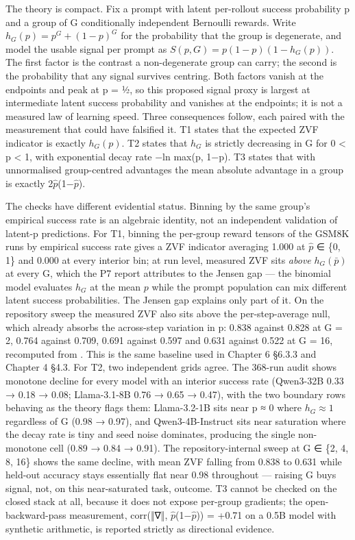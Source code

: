 \documentclass[12pt,a4paper]{report}
\DeclareRobustCommand{\longtok}[1]{\texttt{\seqsplit{#1}}}
\begin{document}
The theory is compact. Fix a prompt with latent per-rollout success
probability p and a group of G conditionally independent Bernoulli
rewards. Write \(h_G(p) = p^G + (1-p)^G\) for the probability that the
group is degenerate, and model the usable signal per prompt as
\(S(p,G) = p(1-p)(1-h_G(p))\). The first factor is the contrast a
non-degenerate group can carry; the second is the probability that any
signal survives centring. Both factors vanish at the endpoints and peak
at p = ½, so this proposed signal proxy is largest at intermediate
latent success probability and vanishes at the endpoints; it is not a
measured law of learning speed. Three consequences follow, each paired
with the measurement that could have falsified it. T1 states that the
expected ZVF indicator is exactly \(h_G(p)\). T2 states that \(h_G\) is
strictly decreasing in G for 0 \textless{} p \textless{} 1, with
exponential decay rate −ln max(p, 1−p). T3 states that with unnormalised
group-centred advantages the mean absolute advantage in a group is
exactly 2\ensuremath{\hat{p}}(1−\ensuremath{\hat{p}}).

The checks have different evidential status. Binning by the same group's
empirical success rate is an algebraic identity, not an independent
validation of latent-p predictions. For T1, binning the per-group reward
tensors of the GSM8K runs by empirical success rate gives a ZVF
indicator averaging 1.000 at \ensuremath{\hat{p}} ∈ \{0, 1\} and 0.000 at every interior
bin; at run level, measured ZVF sits \emph{above} \(h_G(\bar p)\) at
every G, which the P7 report attributes to the Jensen gap --- the
binomial model evaluates \(h_G\) at the mean \(p\) while the prompt
population can mix different latent success probabilities. The Jensen
gap explains only part of it. On the repository sweep the measured ZVF
also sits above the per-step-average null, which already absorbs the
across-step variation in p: 0.838 against 0.828 at G = 2, 0.764 against
0.709, 0.691 against 0.597 and 0.631 against 0.522 at G = 16, recomputed
from \longtok{groupsize\_\allowbreak{}zvf\_\allowbreak{}sweep.json}. This is the same baseline used
in Chapter 6 §6.3.3 and Chapter 4 §4.3. For T2, two independent grids
agree. The 368-run audit shows monotone decline for every model with an
interior success rate (Qwen3-32B 0.33 → 0.18 → 0.08; Llama-3.1-8B 0.76 →
0.65 → 0.47), with the two boundary rows behaving as the theory flags
them: Llama-3.2-1B sits near p ≈ 0 where \(h_G \approx 1\) regardless of
G (0.98 → 0.97), and Qwen3-4B-Instruct sits near saturation where the
decay rate is tiny and seed noise dominates, producing the single
non-monotone cell (0.89 → 0.84 → 0.91). The repository-internal sweep at
G ∈ \{2, 4, 8, 16\} shows the same decline, with mean ZVF falling from
0.838 to 0.631 while held-out accuracy stays essentially flat near 0.98
throughout --- raising G buys signal, not, on this near-saturated task,
outcome. T3 cannot be checked on the closed stack at all, because it
does not expose per-group gradients; the open-backward-pass measurement,
corr(‖∇‖, \ensuremath{\hat{p}}(1−\ensuremath{\hat{p}})) = +0.71 on a 0.5B model with synthetic arithmetic, is
reported strictly as directional evidence.
\end{document}
